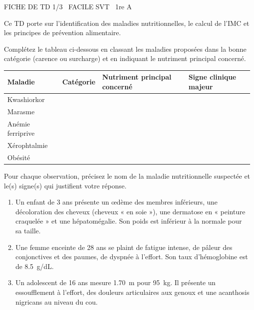 \documentclass[11pt]{article}
\begin{document}
\begin{tcolorbox}[enhanced,colback=popink,colframe=popink,arc=10pt,boxrule=0pt,left=12pt,right=12pt,top=9pt,bottom=9pt]
{\color{white}\popxbold\small FICHE DE TD 1/3 \textbullet\ FACILE \hfill SVT \textbullet\ 1re A\par}
\end{tcolorbox}
\vspace{4pt}
Ce TD porte sur l'identification des maladies nutritionnelles, le calcul de l'IMC et les principes de prévention alimentaire.

\begin{exercice}
Complétez le tableau ci-dessous en classant les maladies proposées dans la bonne catégorie (carence ou surcharge) et en indiquant le nutriment principal concerné.
\begin{center}
\begin{tabularx}{\linewidth}{|X|c|X|X|}
\hline
\textbf{Maladie} & \textbf{Catégorie} & \textbf{Nutriment principal concerné} & \textbf{Signe clinique majeur} \\
\hline
Kwashiorkor & & & \\
\hline
Marasme & & & \\
\hline
Anémie ferriprive & & & \\
\hline
Xérophtalmie & & & \\
\hline
Obésité & & & \\
\hline
\end{tabularx}
\end{center}
\end{exercice}

\begin{exercice}
Pour chaque observation, précisez le nom de la maladie nutritionnelle suspectée et le(s) signe(s) qui justifient votre réponse.
\begin{enumerate}
\item Un enfant de 3 ans présente un œdème des membres inférieurs, une décoloration des cheveux (cheveux « en soie »), une dermatose en « peinture craquelée » et une hépatomégalie. Son poids est inférieur à la normale pour sa taille.
\item Une femme enceinte de 28 ans se plaint de fatigue intense, de pâleur des conjonctives et des paumes, de dyspnée à l'effort. Son taux d'hémoglobine est de \SI{8,5}{g/dL}.
\item Un adolescent de 16 ans mesure \SI{1,70}{m} pour \SI{95}{kg}. Il présente un essoufflement à l'effort, des douleurs articulaires aux genoux et une acanthosis nigricans au niveau du cou.
\end{enumerate}
\end{exercice}
\end{document}
